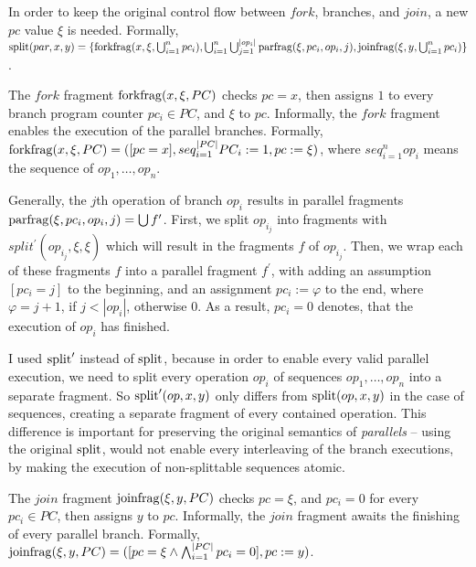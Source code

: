 In order to keep the original control flow between $fork$, branches, and $join$, a new $pc$ value $\xi$ is needed. Formally, $\mathrm{split}(par, x, y) = \{ \mathrm{forkfrag}(x, \xi, \bigcup_{i=1}^{n} pc_i), \bigcup_{i=1}^{n} \bigcup_{j=1}^{|op_i|} \mathrm{parfrag}(\xi, pc_i, op_i, j), \mathrm{joinfrag}(\xi, y, \bigcup_{i=1}^{n} pc_i) \}$.

The $fork$ fragment $\mathrm{forkfrag}(x,\xi,PC)$ checks $pc = x$, then assigns $1$ to every branch program counter $pc_i \in PC$, and $\xi$ to $pc$. Informally, the $fork$ fragment enables the execution of the parallel branches. Formally, $\mathrm{forkfrag}(x,\xi,PC) = ([pc = x], seq_{i=1}^{|PC|} PC_i := 1, pc := \xi)$, where $seq_{i=1}^{n} op_i$ means the sequence of $op_1, \ldots, op_n$.

 Generally, the $j$th operation of branch $op_i$ results in parallel fragments $\mathrm{parfrag}(\xi, pc_i, op_i, j) = \bigcup f^\prime$. First, we split $op_{i_j}$ into fragments with $split^\prime(op_{i_j}, \xi, \xi)$ which will result in the fragments $f$ of $op_{i_j}$. Then, we wrap each of these fragments $f$ into a parallel fragment $f^\prime$, with adding an assumption $[pc_i = j]$ to the beginning, and an assignment $pc_i := \varphi$ to the end, where $\varphi=j+1$, if $j < |op_i|$, otherwise $0$. As a result, $pc_i = 0$ denotes, that the execution of $op_i$ has finished.
 
 I used $\mathrm{split}^\prime$ instead of $\mathrm{split}$, because in order to enable every valid parallel execution, we need to split every operation $op_i$ of sequences $op_1, \ldots, op_n$ into a separate fragment. So $\mathrm{split}^\prime(op, x, y)$ only differs from $\mathrm{split}(op, x, y)$ in the case of sequences, creating a separate fragment of every contained operation. This difference is important for preserving the original semantics of \textit{parallels} -- using the original $\mathrm{split}$, would not enable every interleaving of the branch executions, by making the execution of non-splittable sequences atomic.
 
The $join$ fragment $\mathrm{joinfrag}(\xi, y, PC)$ checks $pc = \xi$, and $pc_i = 0$ for every $pc_i \in PC$, then assigns $y$ to $pc$. Informally, the $join$ fragment awaits the finishing of every parallel branch. Formally, $\mathrm{joinfrag}(\xi, y, PC) = ([pc = \xi \land \bigwedge_{i=1}^{|PC|} pc_i = 0], pc := y)$.

